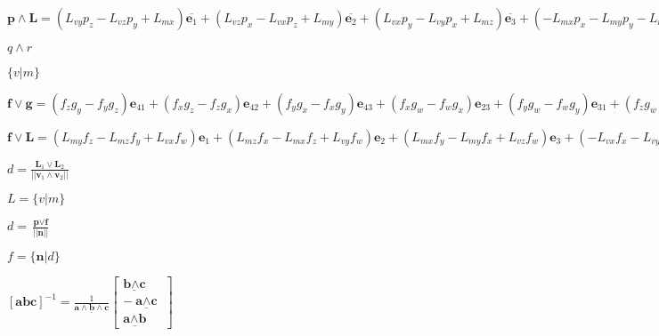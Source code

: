 \documentclass{article}
\def\lthtmlcheckvsize{\ifdim\ht\sizebox<\vsize 
  \ifdim\wd\sizebox<\hsize\expandafter\hfill\fi \expandafter\vfill
  \else\expandafter\vss\fi}%
\begin{document}
{\newpage\clearpage
{}%
$ \textbf{p} \wedge \textbf{L} = (L_{vy}p_z - L_{vz}p_y + L_{mx})\overline{\textbf{e}_1} +
(L_{vz}p_x - L_{vx}p_z + L_{my})\overline{\textbf{e}_2} +
(L_{vx}p_y - L_{vy}p_x + L_{mz})\overline{\textbf{e}_3} + 
(-L_{mx}p_x - L_{my}p_y - L_{mz}p_z)\overline{\textbf{e}_4} $%
\lthtmlindisplaymathZ
\lthtmlcheckvsize\clearpage}

{\newpage\clearpage
{}%
$ q \wedge r $%
\lthtmlindisplaymathZ
\lthtmlcheckvsize\clearpage}

{\newpage\clearpage
{}%
$ \{v|m\}$%
\lthtmlindisplaymathZ
\lthtmlcheckvsize\clearpage}

{\newpage\clearpage
{}%
$ \textbf{f} \vee \textbf{g} = (f_zg_y - f_yg_z)\textbf{e}_{41} + (f_xg_z - f_zg_x)\textbf{e}_{42} + 
(f_yg_x - f_xg_y)\textbf{e}_{43} + (f_xg_w - f_wg_x)\textbf{e}_{23} + (f_yg_w - f_wg_y)\textbf{e}_{31}
+ (f_zg_w - f_wg_z)\textbf{e}_{12} $%
\lthtmlindisplaymathZ
\lthtmlcheckvsize\clearpage}

{\newpage\clearpage
{}%
$ \textbf{f} \vee \textbf{L} = (L_{my}f_z - L_{mz}f_y + L_{vx}f_w)\textbf{e}_1 +
(L_{mz}f_x - L_{mx}f_z + L_{vy}f_w)\textbf{e}_2 +
(L_{mx}f_y - L_{my}f_x + L_{vz}f_w)\textbf{e}_3 +
(-L_{vx}f_x - L_{vy}f_y - L_{vz}f_z)\textbf{e}_4 $%
\lthtmlindisplaymathZ
\lthtmlcheckvsize\clearpage}

{\newpage\clearpage
{}%
$ d = \frac{\textbf{L}_1 \vee \textbf{L}_2}{|| \textbf{v}_1 \wedge \textbf{v}_2||} $%
\lthtmlindisplaymathZ
\lthtmlcheckvsize\clearpage}

{\newpage\clearpage
{}%
$ L = \{v | m\}$%
\lthtmlindisplaymathZ
\lthtmlcheckvsize\clearpage}

{\newpage\clearpage
{}%
$ d = \frac{\textbf{p} \vee \textbf{f}}{|| \textbf{n} ||} $%
\lthtmlindisplaymathZ
\lthtmlcheckvsize\clearpage}

{\newpage\clearpage
{}%
$ f = \{\textbf{n} | d\}$%
\lthtmlindisplaymathZ
\lthtmlcheckvsize\clearpage}



\setlength{\extrarowheight}{10pt}%

\setlength{\extrarowheight}{10pt}
{\newpage\clearpage
{}%
$ [\textbf{a} \textbf{b} \textbf{c}]^{-1} = 
\frac{1}{\underline{\textbf{a} \wedge \textbf{b} \wedge \textbf{c}}} 
\begin{bmatrix}
\underline{\textbf{b} \wedge \textbf{c}} \\
-\underline{\textbf{a} \wedge \textbf{c}} \\
\underline{\textbf{a} \wedge \textbf{b}}
\end{bmatrix} $%
\lthtmlindisplaymathZ
\lthtmlcheckvsize\clearpage}
\end{document}
